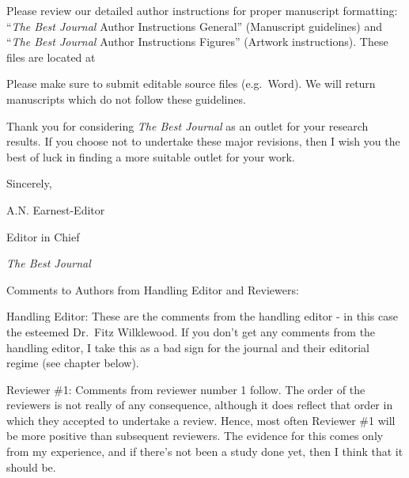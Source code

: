 \documentclass[
]{krantz}
\renewenvironment{quote}{\begin{VF}}{\end{VF}}
\begin{document}
\begin{quote}
Please review our detailed author instructions for proper manuscript formatting: ``\emph{The Best Journal} Author Instructions General'' (Manuscript guidelines) and ``\emph{The Best Journal} Author Instructions Figures'' (Artwork instructions). These files are located at
\end{quote}

\begin{quote}
Please make sure to submit editable source files (e.g.~Word). We will return manuscripts which do not follow these guidelines.
\end{quote}

\begin{quote}
Thank you for considering \emph{The Best Journal} as an outlet for your research results. If you choose not to undertake these major revisions, then I wish you the best of luck in finding a more suitable outlet for your work.
\end{quote}

\begin{quote}
Sincerely,
\end{quote}

\begin{quote}
A.N. Earnest-Editor
\end{quote}

\begin{quote}
Editor in Chief
\end{quote}

\begin{quote}
\emph{The Best Journal}
\end{quote}

\begin{quote}
Comments to Authors from Handling Editor and Reviewers:
\end{quote}

\begin{quote}
Handling Editor: These are the comments from the handling editor - in this case the esteemed Dr.~Fitz Wilklewood. If you don't get any comments from the handling editor, I take this as a bad sign for the journal and their editorial regime (see chapter below).
\end{quote}

\begin{quote}
Reviewer \#1: Comments from reviewer number 1 follow. The order of the reviewers is not really of any consequence, although it does reflect that order in which they accepted to undertake a review. Hence, most often Reviewer \#1 will be more positive than subsequent reviewers. The evidence for this comes only from my experience, and if there's not been a study done yet, then I think that it should be.
\end{quote}
\end{document}
